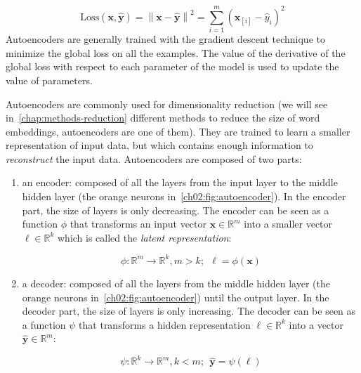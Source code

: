     \begin{equation}
      \text{Loss}(\mathbf{x}, \mathbf{\hat{y}})
        = \left\lVert \mathbf{x} - \mathbf{\hat{y}} \right\rVert^2
        = \sum_{i = 1}^m (\mathbf{x}_{[i]} - \hat{y}_i)^2
    \end{equation}
    Autoencoders are generally trained with the gradient descent technique to
    minimize the global loss on all the examples. The value of the derivative of
    the global loss with respect to each parameter of the model is used to
    update the value of parameters. \medskip

    Autoencoders are commonly used for dimensionality reduction (we will see
    in~\autoref{chap:methods-reduction} different methods to reduce the size of
    word embeddings, autoencoders are one of them). They are trained to learn a
    smaller representation of input data, but which contains enough information
    to \textit{reconstruct} the input data. Autoencoders are composed of two
    parts:

    \begin{enumerate}
      \item an encoder: composed of all the layers from the input layer to the
        middle hidden layer (the orange neurons
        in~\autoref{ch02:fig:autoencoder}). In the encoder part, the size of
        layers is only decreasing. The encoder can be seen as a function $\phi$
        that transforms an input vector $\mathbf{x} \in \mathbb{R}^m$ into a
        smaller vector $\ell \in \mathbb{R}^k$ which is called the
        \textit{latent representation}:

        \begin{equation}
          \phi: \mathbb{R}^m \to \mathbb{R}^k, m > k;~~\ell = \phi(\mathbf{x})
        \end{equation}

      \item a decoder: composed of all the layers from the middle hidden layer
        (the orange neurons in~\autoref{ch02:fig:autoencoder}) until the output
        layer. In the decoder part, the size of layers is only increasing. The
        decoder can be seen as a function $\psi$ that transforms a hidden
        representation $\ell \in \mathbb{R}^k$ into a vector $\mathbf{\hat{y}}
        \in \mathbb{R}^m$:

        \begin{equation}
          \psi: \mathbb{R}^k \to \mathbb{R}^m, k < m;~~\mathbf{\hat{y}} =
          \psi(\ell)
        \end{equation}
    \end{enumerate}

